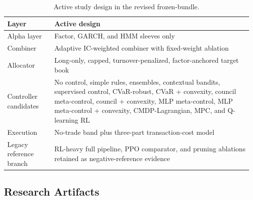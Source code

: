 \documentclass[10pt,twocolumn]{article}
\begin{document}
\begin{table}[t]
\centering
\caption{Active study design in the revised frozen-bundle.}
\label{tab:archsnapshot}
\small
\begin{tabular}{@{} l p{} @{}}
\toprule
\textbf{Layer} & \textbf{Active design} \\
\midrule
Alpha layer & Factor, GARCH, and HMM sleeves only \\
Combiner & Adaptive IC-weighted combiner with fixed-weight ablation \\
Allocator & Long-only, capped, turnover-penalized, factor-anchored target book \\
Controller candidates & No control, simple rules, ensembles, contextual bandits, supervised control, CVaR-robust, CVaR + convexity, council meta-control, council + convexity, MLP meta-control, MLP meta-control + convexity, CMDP-Lagrangian, MPC, and Q-learning RL \\
Execution & No-trade band plus three-part transaction-cost model \\
Legacy reference branch & RL-heavy full pipeline, PPO comparator, and pruning ablations retained as negative-reference evidence \\
\bottomrule
\end{tabular}
\end{table}

\subsection{Research Artifacts}
\end{document}
